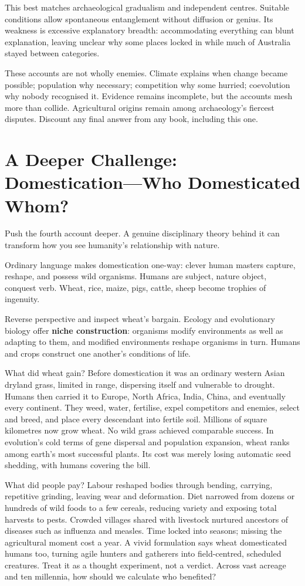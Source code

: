 This best matches archaeological gradualism and independent centres. Suitable conditions allow spontaneous entanglement without diffusion or genius. Its weakness is excessive explanatory breadth: accommodating everything can blunt explanation, leaving unclear why some places locked in while much of Australia stayed between categories.

These accounts are not wholly enemies. Climate explains when change became possible; population why necessary; competition why some hurried; coevolution why nobody recognised it. Evidence remains incomplete, but the accounts mesh more than collide. Agricultural origins remain among archaeology's fiercest disputes. Discount any final answer from any book, including this one.

\section[Further Challenge: Who Domesticated Whom?]{A Deeper Challenge: Domestication---Who Domesticated Whom?}
Push the fourth account deeper. A genuine disciplinary theory behind it can transform how you see humanity's relationship with nature.

Ordinary language makes domestication one-way: clever human masters capture, reshape, and possess wild organisms. Humans are subject, nature object, conquest verb. Wheat, rice, maize, pigs, cattle, sheep become trophies of ingenuity.

Reverse perspective and inspect wheat's bargain. Ecology and evolutionary biology offer \textbf{niche construction}: organisms modify environments as well as adapting to them, and modified environments reshape organisms in turn. Humans and crops construct one another's conditions of life.

What did wheat gain? Before domestication it was an ordinary western Asian dryland grass, limited in range, dispersing itself and vulnerable to drought. Humans then carried it to Europe, North Africa, India, China, and eventually every continent. They weed, water, fertilise, expel competitors and enemies, select and breed, and place every descendant into fertile soil. Millions of square kilometres now grow wheat. No wild grass achieved comparable success. In evolution's cold terms of gene dispersal and population expansion, wheat ranks among earth's most successful plants. Its cost was merely losing automatic seed shedding, with humans covering the bill.

What did people pay? Labour reshaped bodies through bending, carrying, repetitive grinding, leaving wear and deformation. Diet narrowed from dozens or hundreds of wild foods to a few cereals, reducing variety and exposing total harvests to pests. Crowded villages shared with livestock nurtured ancestors of diseases such as influenza and measles. Time locked into seasons; missing the agricultural moment cost a year. A vivid formulation says wheat domesticated humans too, turning agile hunters and gatherers into field-centred, scheduled creatures. Treat it as a thought experiment, not a verdict. Across vast acreage and ten millennia, how should we calculate who benefited?

